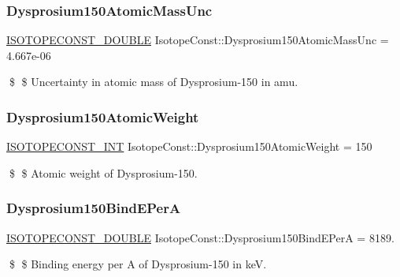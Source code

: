 \subsubsection{\texorpdfstring{Dysprosium150\+Atomic\+Mass\+Unc}{Dysprosium150AtomicMassUnc}}
{\footnotesize\ttfamily \mbox{\hyperlink{group___isotope_const-_macros_ga8f45a7272ce02c0b4c65c44636ed719a}{I\+S\+O\+T\+O\+P\+E\+C\+O\+N\+S\+T\+\_\+\+D\+O\+U\+B\+LE}} Isotope\+Const\+::\+Dysprosium150\+Atomic\+Mass\+Unc = 4.\+667e-\/06}

\$ \$ Uncertainty in atomic mass of Dysprosium-\/150 in amu. \mbox{\label{group___isotope_const-_dysprosium-_dy150_ga6b54d86e3f3b28d0d8cc4af4c23aac63}} 
\subsubsection{\texorpdfstring{Dysprosium150\+Atomic\+Weight}{Dysprosium150AtomicWeight}}
{\footnotesize\ttfamily \mbox{\hyperlink{group___isotope_const-_macros_ga5f18360b3e99483a35c32d789e62621c}{I\+S\+O\+T\+O\+P\+E\+C\+O\+N\+S\+T\+\_\+\+I\+NT}} Isotope\+Const\+::\+Dysprosium150\+Atomic\+Weight = 150}

\$ \$ Atomic weight of Dysprosium-\/150. \mbox{\label{group___isotope_const-_dysprosium-_dy150_ga55d26d22ea28dbda89c47ced30f71a46}} 
\subsubsection{\texorpdfstring{Dysprosium150\+Bind\+E\+PerA}{Dysprosium150BindEPerA}}
{\footnotesize\ttfamily \mbox{\hyperlink{group___isotope_const-_macros_ga8f45a7272ce02c0b4c65c44636ed719a}{I\+S\+O\+T\+O\+P\+E\+C\+O\+N\+S\+T\+\_\+\+D\+O\+U\+B\+LE}} Isotope\+Const\+::\+Dysprosium150\+Bind\+E\+PerA = 8189.}

\$ \$ Binding energy per A of Dysprosium-\/150 in keV. \mbox{\label{group___isotope_const-_dysprosium-_dy150_gaf11e54a633d7e712bf603641bef69004}} 
